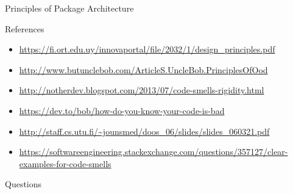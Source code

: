 \documentclass[xcolor=svgnames]{beamer}
\begin{document}

\begin{frame}{Principles of Package Architecture}
\end{frame}


\begin{frame}{References}
    \begin{itemize}
        \item \url{https://fi.ort.edu.uy/innovaportal/file/2032/1/design_principles.pdf}
        \item \url{http://www.butunclebob.com/ArticleS.UncleBob.PrinciplesOfOod}
        \item \url{http://notherdev.blogspot.com/2013/07/code-smells-rigidity.html}
        \item \url{https://dev.to/bob/how-do-you-know-your-code-is-bad}
        \item \url{http://staff.cs.utu.fi/~jounsmed/doos_06/slides/slides_060321.pdf}
        \item \url{https://softwareengineering.stackexchange.com/questions/357127/clear-examples-for-code-smells}
    \end{itemize}
\end{frame}


\begin{frame}{Questions}
\end{frame}

\fi
\end{document}
